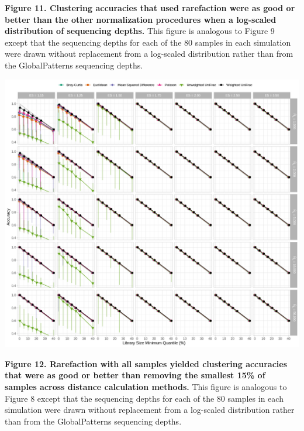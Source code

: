 \documentclass[
]{article}
\begin{document}
\textbf{Figure 11. Clustering accuracies that used rarefaction were as
good or better than the other normalization procedures when a log-scaled
distribution of sequencing depths.} This figure is analogous to Figure 9
except that the sequencing depths for each of the 80 samples in each
simulation were drawn without replacement from a log-scaled distribution
rather than from the GlobalPatterns sequencing depths.

\newpage

\includegraphics{figure_12.png}

\textbf{Figure 12. Rarefaction with all samples yielded clustering
accuracies that were as good or better than removing the smallest 15\%
of samples across distance calculation methods.} This figure is
analogous to Figure 8 except that the sequencing depths for each of the
80 samples in each simulation were drawn without replacement from a
log-scaled distribution rather than from the GlobalPatterns sequencing
depths.

\newpage
\end{document}
